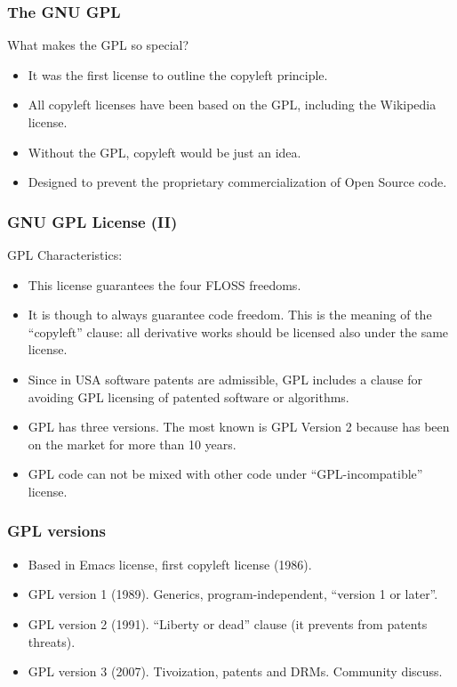 \begin{frame}
\frametitle{The GNU GPL}
What makes the GPL so special?
\pause
\begin{itemize}
\item It was the first license to outline the copyleft principle.
\item All copyleft licenses have been based on the GPL, including the Wikipedia license.
\item Without the GPL, copyleft would be just an idea. 
\pause
\item Designed to prevent the proprietary commercialization of Open Source code.
\end{itemize}

\end{frame}


\begin{frame}
\frametitle{GNU GPL License (II)}

GPL Characteristics:
\begin{itemize}
\item This license guarantees the four FLOSS freedoms.
\item It is though to always guarantee code freedom. This is the
  meaning of the ``copyleft'' clause: all derivative works should be
  licensed also under the same license.
\item Since in USA software patents are admissible, GPL includes a
  clause for avoiding GPL licensing of patented software or
  algorithms.
\item GPL has three versions. The most known is GPL Version 2 because
  has been on the market for more than 10 years. 
\item GPL code can not be mixed with other code under
  ``GPL-incompatible'' license.
\end{itemize}

\end{frame}


\begin{frame}
\frametitle{GPL versions}

\begin{itemize}
\item Based in Emacs license, first copyleft license (1986).
\item GPL version 1 (1989). Generics, program-independent, ``version 1 or later''.
\item GPL version 2 (1991). ``Liberty or dead'' clause (it prevents from patents threats).
\item GPL version 3 (2007). Tivoization, patents and DRMs. Community discuss.
\end{itemize}


\end{frame}


